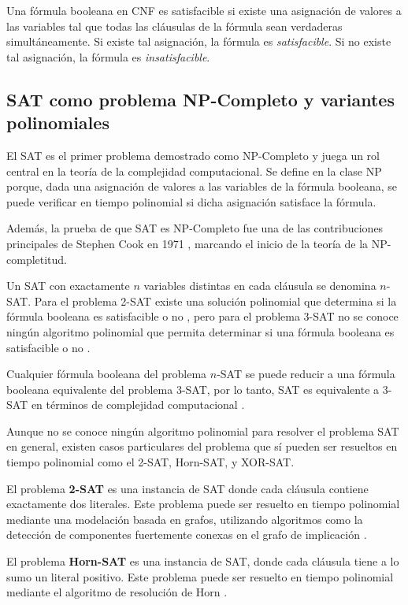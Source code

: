 Una fórmula booleana en CNF es satisfacible si existe una asignación de valores a las variables tal que todas las cláusulas de la fórmula sean verdaderas simultáneamente.
Si existe tal asignación, la fórmula es \textit{satisfacible}. Si no existe tal asignación, la fórmula es \textit{insatisfacible}.

\subsection{SAT como problema NP-Completo y variantes polinomiales}

El SAT es el primer problema demostrado como NP-Completo \cite{authomataTheory} y juega un rol central en la teoría de la complejidad computacional. Se define en la clase NP porque, dada una asignación de valores a las variables de la fórmula booleana, se puede verificar en tiempo polinomial si dicha asignación satisface la fórmula.

Además, la prueba de que SAT es NP-Completo fue una de las contribuciones principales de Stephen Cook en 1971 \cite{Cook1971}, marcando el inicio de la teoría de la NP-completitud.

Un SAT con exactamente $n$ variables distintas en cada cláusula se denomina $n$-SAT. Para el problema 2-SAT existe una solución polinomial que determina si la fórmula booleana es satisfacible o no \cite{2satbib}, pero para el problema 3-SAT no se conoce ningún algoritmo polinomial que permita
determinar si una fórmula booleana es satisfacible o no \cite{authomataTheory}.

Cualquier fórmula booleana del problema $n$-SAT se puede reducir a una fórmula booleana equivalente del problema 3-SAT,
por lo tanto, SAT es equivalente a 3-SAT en términos de complejidad computacional \cite{authomataTheory}.

Aunque no se conoce ningún algoritmo polinomial para resolver el problema SAT en general,
existen casos particulares del problema que sí pueden ser resueltos en tiempo polinomial como el 2-SAT, Horn-SAT, y XOR-SAT.


El problema \textbf{2-SAT} es una instancia de SAT donde cada cláusula contiene exactamente dos literales.  Este problema puede ser resuelto en tiempo polinomial mediante una modelación basada en grafos, utilizando algoritmos como la detección de componentes fuertemente conexas en el grafo de implicación \cite{2satbib}.

El problema \textbf{Horn-SAT} es una instancia de SAT, donde cada cláusula tiene a lo sumo un literal positivo.  Este problema puede ser resuelto en tiempo polinomial mediante el algoritmo de resolución de Horn \cite{hornsatbib}.

